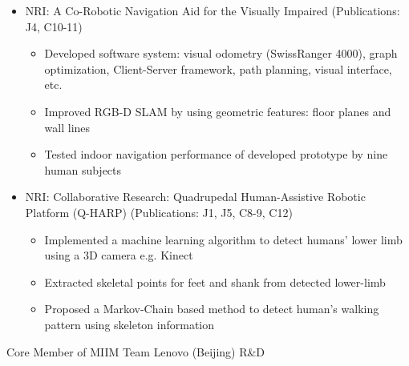 \begin{cventries}
{\begin{justify}
\begin{itemize}[leftmargin=2ex, nosep, noitemsep]
 		\setlength{\parskip}{0pt}
 		\renewcommand{\labelitemi}{\bullet}
 		\item {NRI: A Co-Robotic Navigation Aid for the Visually Impaired (Publications: J4, C10-11)}
 		\begin{itemize}[leftmargin=3ex]
 			\scriptsize
 			\item {Developed software system: visual odometry (SwissRanger 4000), graph optimization, Client-Server framework, path planning, visual interface, etc.}
 			\item {Improved RGB-D SLAM by using geometric features: floor planes and wall lines}
 			\item {Tested indoor navigation performance of developed prototype by nine human subjects}
 		\end{itemize}
 		\item {NRI: Collaborative Research: Quadrupedal Human-Assistive Robotic Platform (Q-HARP) (Publications: J1, J5, C8-9, C12)}
 		\begin{itemize}[leftmargin=3ex]
 			\scriptsize
 			\item {Implemented a machine learning algorithm to detect humans' lower limb using a 3D camera e.g. Kinect}
 			\item {Extracted skeletal points for feet and shank from detected lower-limb}
 			\item {Proposed a Markov-Chain based method to detect human’s walking pattern using skeleton information}
 		\end{itemize}
 	\end{itemize}
 \end{justify}
 \vspace{-2.0mm}  
    }
	   \cventry
		{Core Member of MIIM Team} %
		{Lenovo (Beijing) R\&D} %

\end{cventries}
